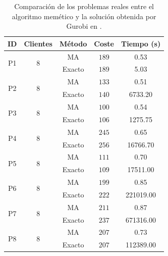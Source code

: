 \begin{table}[!t]
    \centering    
    \caption{Comparación de los problemas reales entre el algoritmo memético y la solución obtenida por Gurobi en \cite{laura-mcttrp}.}
    \begin{tabular}{ccccc}
    \hline
    ID & Clientes & Método & Coste & Tiempo (s) \\
    \midrule
    \multirow{2}{*}{P1} & \multirow{2}{*}{$8$} & MA & $189$ & 0.53 \\
     &  & Exacto & $189$ & 5.03 \\[+5pt]
    \multirow{2}{*}{P2} & \multirow{2}{*}{$8$} & MA & $133$ & 0.51 \\
    &  & Exacto & $140$ & 6733.20 \\[+5pt]
    \multirow{2}{*}{P3} & \multirow{2}{*}{$8$} & MA & $100$ & 0.54 \\
    &  & Exacto & $106$ & 1275.75 \\[+5pt]
    \multirow{2}{*}{P4} & \multirow{2}{*}{$8$} & MA & $245$ & 0.65 \\
    &  & Exacto & $256$ & 16766.70 \\[+5pt]
    \multirow{2}{*}{P5} & \multirow{2}{*}{$8$} & MA & $111$ & 0.70 \\
    &  & Exacto & $109$ & 17511.00 \\[+5pt]
    \multirow{2}{*}{P6} & \multirow{2}{*}{$8$} & MA & $199$ & 0.85 \\
    &  & Exacto & $222$ & 221019.00 \\[+5pt]
    \multirow{2}{*}{P7} & \multirow{2}{*}{$8$} & MA & $211$ & 0.87 \\
    &  & Exacto & $237$ & 671316.00 \\[+5pt]
    \multirow{2}{*}{P8} & \multirow{2}{*}{$8$} & MA & $207$ & 0.73 \\
    &  & Exacto & $207$ & 112389.00 \\
    \hline
    \end{tabular}
    \label{tab:problemas_reales_res}
\end{table}

